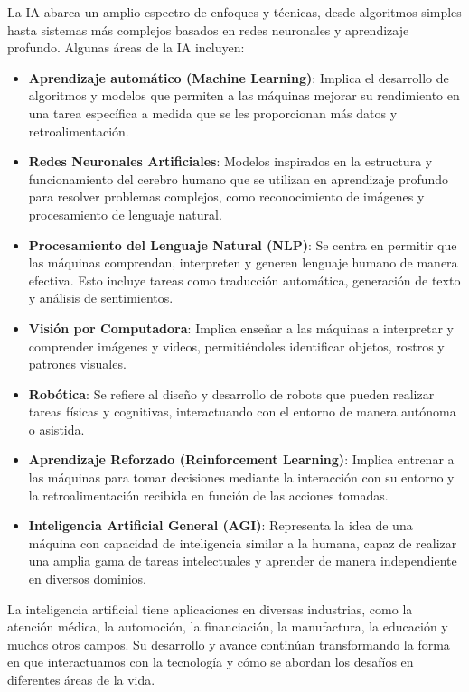 \documentclass[12pt,twoside,titlepage]{ingenius}
\begin{document}
\begin{multicols}{2}
La IA abarca un amplio espectro de enfoques y técnicas, desde algoritmos simples hasta sistemas más complejos basados en redes neuronales y aprendizaje profundo. \cite{6} Algunas áreas de la IA incluyen:
\begin{itemize}
	\item \textbf{Aprendizaje automático (Machine Learning)}: Implica el desarrollo de algoritmos y modelos que permiten a las máquinas mejorar su rendimiento en una tarea específica a medida que se les proporcionan más datos y retroalimentación.
	\item \textbf{Redes Neuronales Artificiales}: Modelos inspirados en la estructura y funcionamiento del cerebro humano que se utilizan en aprendizaje profundo para resolver problemas complejos, como reconocimiento de imágenes y procesamiento de lenguaje natural.
	\item \textbf{Procesamiento del Lenguaje Natural (NLP)}: Se centra en permitir que las máquinas comprendan, interpreten y generen lenguaje humano de manera efectiva. Esto incluye tareas como traducción automática, generación de texto y análisis de sentimientos.
	\item \textbf{Visión por Computadora}: Implica enseñar a las máquinas a interpretar y comprender imágenes y videos, permitiéndoles identificar objetos, rostros y patrones visuales.
	\item \textbf{Robótica}: Se refiere al diseño y desarrollo de robots que pueden realizar tareas físicas y cognitivas, interactuando con el entorno de manera autónoma o asistida.
	\item \textbf{Aprendizaje Reforzado (Reinforcement Learning)}: Implica entrenar a las máquinas para tomar decisiones mediante la interacción con su entorno y la retroalimentación recibida en función de las acciones tomadas.
	\item \textbf{Inteligencia Artificial General (AGI)}: Representa la idea de una máquina con capacidad de inteligencia similar a la humana, capaz de realizar una amplia gama de tareas intelectuales y aprender de manera independiente en diversos dominios.
\end{itemize}

La inteligencia artificial tiene aplicaciones en diversas industrias, como la atención médica, la automoción, la financiación, la manufactura, la educación y muchos otros campos. Su desarrollo y avance continúan transformando la forma en que interactuamos con la tecnología y cómo se abordan los desafíos en diferentes áreas de la vida. \cite{7}


\end{multicols}
\end{document}
